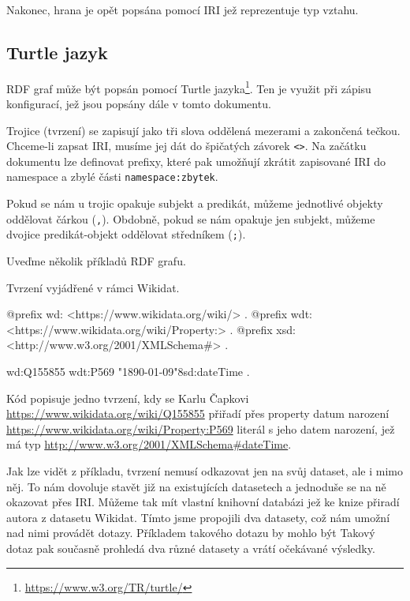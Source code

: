 Nakonec, hrana je opět popsána pomocí IRI jež reprezentuje typ vztahu.

\subsection{Turtle jazyk}
RDF graf může být popsán pomocí Turtle jazyka\footnote{\url{https://www.w3.org/TR/turtle/}}. Ten je využit při zápisu konfigurací, jež jsou popsány dále v tomto dokumentu.

Trojice (tvrzení) se zapisují jako tři slova oddělená mezerami a zakončená tečkou. Chceme-li zapsat IRI, musíme jej dát do špičatých závorek \texttt{<>}. Na začátku dokumentu lze definovat prefixy, které pak umožňují zkrátit zapisované IRI do namespace a zbylé části \texttt{namespace:zbytek}.

Pokud se nám u trojic opakuje subjekt a predikát, můžeme jednotlivé objekty oddělovat čárkou (\texttt{,}). Obdobně, pokud se nám opakuje jen subjekt, můžeme dvojice predikát-objekt oddělovat středníkem (\texttt{;}).

\newpage

Uveďme několik příkladů RDF grafu.

\begin{prikl}
Tvrzení  vyjádřené v rámci Wikidat.
\begin{code}
@prefix wd: <https://www.wikidata.org/wiki/> .
@prefix wdt: <https://www.wikidata.org/wiki/Property:> .
@prefix xsd: <http://www.w3.org/2001/XMLSchema#> .

wd:Q155855 wdt:P569 "1890-01-09"^^xsd:dateTime .
\end{code}

Kód popisuje jedno tvrzení, kdy se Karlu Čapkovi \\ \url{https://www.wikidata.org/wiki/Q155855} přiřadí přes property datum narození \url{https://www.wikidata.org/wiki/Property:P569} literál s jeho datem narození, jež má typ \url{http://www.w3.org/2001/XMLSchema#dateTime}.
\end{prikl}

Jak lze vidět z příkladu, tvrzení nemusí odkazovat jen na svůj dataset, ale i mimo něj. To nám dovoluje stavět již na existujících datasetech a jednoduše se na ně okazovat přes IRI. Můžeme tak mít vlastní knihovní databázi jež ke knize přiradí autora z datasetu Wikidat. Tímto jsme propojili dva datasety, což nám umožní nad nimi provádět dotazy. Příkladem takového dotazu by mohlo být  Takový dotaz pak současně prohledá dva různé datasety a vrátí očekávané výsledky.

